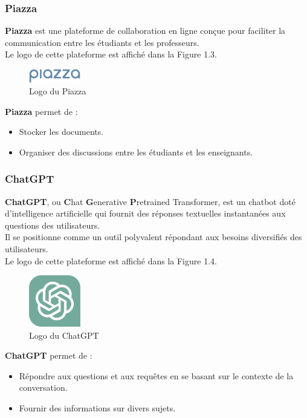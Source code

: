 \subsubsection{Piazza}
    \textbf{Piazza} est une plateforme de collaboration en ligne conçue pour faciliter la communication entre les étudiants et les professeurs.\\
    Le logo de cette plateforme est affiché dans la Figure 1.3.
    \begin{figure}[H]
        \centering
        \includegraphics[width=0.2\textwidth,height=0.15\textwidth]{images/piazza-logo.png}
        \caption{Logo du Piazza \cite{piazza}}
        \label{fig:piazza-logo}
    \end{figure}
    \noindent \textbf{Piazza} permet de :
        \begin{itemize}[itemsep=1pt, parsep=1pt]
            \item Stocker les documents.
            \item Organiser des discussions entre les étudiants et les enseignants.
        \end{itemize}

\subsubsection{ChatGPT}
\textbf{ChatGPT}, ou \textbf{C}hat \textbf{G}enerative \textbf{P}retrained Transformer, est un chatbot doté d'intelligence artificielle qui fournit des réponses textuelles instantanées aux questions des utilisateurs.\\
Il se positionne comme un outil polyvalent répondant aux besoins diversifiés des utilisateurs.\\
Le logo de cette plateforme est affiché dans la Figure 1.4.
\begin{figure}[H]
    \centering
    \includegraphics[width=0.2\textwidth]{images/chatgpt-logo.png}
    \caption{Logo du ChatGPT \cite{chatgpt}}
    \label{fig:chatgpt-logo}
\end{figure}
\noindent \textbf{ChatGPT} permet de :
    \begin{itemize}[itemsep=1pt, parsep=1pt]
        \item Répondre aux questions et aux requêtes en se basant sur le contexte de la conversation.
        \item Fournir des informations sur divers sujets.
    \end{itemize}

